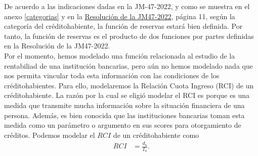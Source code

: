 De acuerdo a las indicaciones dadas en la JM-47-2022, y como se muestra en el anexo \ref{categorias} y en la \href{https://banguat.gob.gt/sites/default/files/banguat/Publica/Res_JM/2022/Res_JM-47-2022.pdf}{Resolución de la JM47-2022}, página 11, según la categoría del créditohabiente, la función de reservas estará bien definida. Por tanto, la función de reservas es el producto de dos funciones por partes definidas en la Resolución de la JM47-2022.\\

Por el momento, hemos modelado una función relacionada al estudio de la rentabiliad de una institución bancarias, pero aún no hemos modelado nada que nos permita vincular toda esta información con las condiciones de los créditohabientes. Para ello, modelaremos la Relación Cuota Ingreso (RCI) de un créditohabiente. La razón por la cual se eligió modelar el RCI es porque es una medida que transmite mucha información sobre la situación financiera de una persona. Además, es bien conocida que las instituciones bancarias toman esta medida como un parámetro o argumento en sus scores para otorgamiento de créditos. Podemos modelar el $RCI$ de un créditohabiente como
\begin{align*}
    RCI &= \frac{d_n}{I_n}.
\end{align*}

